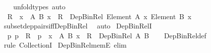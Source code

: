\begin{isabellebody}
%
\isadelimproof
\ \ %
\endisadelimproof
%
\isatagproof
{}\isamarkupfalse%
\ unfold{\isacharunderscore}{\kern0pt}types\ auto%
\endisatagproof
{\isafoldproof}%
%
\isadelimproof
\isanewline
%
\endisadelimproof
\isanewline
{}\isamarkupfalse%
\isanewline
\ \ {\isachardoublequoteopen}R\ {\isasymsubseteq}\ {\isacharparenleft}{\kern0pt}{\isasymSum}x\ {\isasymin}\ A{\isachardot}{\kern0pt}\ {\isacharparenleft}{\kern0pt}B\ x{\isacharparenright}{\kern0pt}{\isacharparenright}{\kern0pt}{\isachardoublequoteclose}\ {\isasymrightleftharpoons}\ {\isachardoublequoteopen}R\ {\isacharcolon}{\kern0pt}\ Dep{\isacharunderscore}{\kern0pt}Bin{\isacharunderscore}{\kern0pt}Rel\ {\isacharparenleft}{\kern0pt}Element\ A{\isacharparenright}{\kern0pt}\ {\isacharparenleft}{\kern0pt}{\isasymlambda}x{\isachardot}{\kern0pt}\ Element\ {\isacharparenleft}{\kern0pt}B\ x{\isacharparenright}{\kern0pt}{\isacharparenright}{\kern0pt}{\isachardoublequoteclose}\isanewline
%
\isadelimproof
\ \ %
\endisadelimproof
%
\isatagproof
{}\isamarkupfalse%
\ subset{\isacharunderscore}{\kern0pt}dep{\isacharunderscore}{\kern0pt}pairs{\isacharunderscore}{\kern0pt}iff{\isacharunderscore}{\kern0pt}Dep{\isacharunderscore}{\kern0pt}Bin{\isacharunderscore}{\kern0pt}Rel\ \isamarkupfalse%
\ auto%
\endisatagproof
{\isafoldproof}%
%
\isadelimproof
\isanewline
%
\endisadelimproof
\isanewline
{}\isamarkupfalse%
\ Dep{\isacharunderscore}{\kern0pt}Bin{\isacharunderscore}{\kern0pt}RelI{\isacharcolon}{\kern0pt}\isanewline
\ \ {\isachardoublequoteopen}{\isacharparenleft}{\kern0pt}{\isasymAnd}p{\isachardot}{\kern0pt}\ p\ {\isasymin}\ R\ {\isasymLongrightarrow}\ p\ {\isacharcolon}{\kern0pt}\ {\isasymSum}x\ {\isacharcolon}{\kern0pt}\ A{\isachardot}{\kern0pt}\ {\isacharparenleft}{\kern0pt}B\ x{\isacharparenright}{\kern0pt}{\isacharparenright}{\kern0pt}\ {\isasymLongrightarrow}\ R\ {\isacharcolon}{\kern0pt}\ Dep{\isacharunderscore}{\kern0pt}Bin{\isacharunderscore}{\kern0pt}Rel\ A\ B{\isachardoublequoteclose}\isanewline
%
\isadelimproof
\ \ %
\endisadelimproof
%
\isatagproof
{}\isamarkupfalse%
\ Dep{\isacharunderscore}{\kern0pt}Bin{\isacharunderscore}{\kern0pt}Rel{\isacharunderscore}{\kern0pt}def\ \isamarkupfalse%
\ {\isacharparenleft}{\kern0pt}rule\ CollectionI{\isacharparenright}{\kern0pt}%
\endisatagproof
{\isafoldproof}%
%
\isadelimproof
\isanewline
%
\endisadelimproof
\isanewline
{}\isamarkupfalse%
\ Dep{\isacharunderscore}{\kern0pt}Bin{\isacharunderscore}{\kern0pt}Rel{\isacharunderscore}{\kern0pt}memE\ {\isacharbrackleft}{\kern0pt}elim{\isacharbrackright}{\kern0pt}{\isacharcolon}{\kern0pt}\isanewline

\end{isabellebody}
